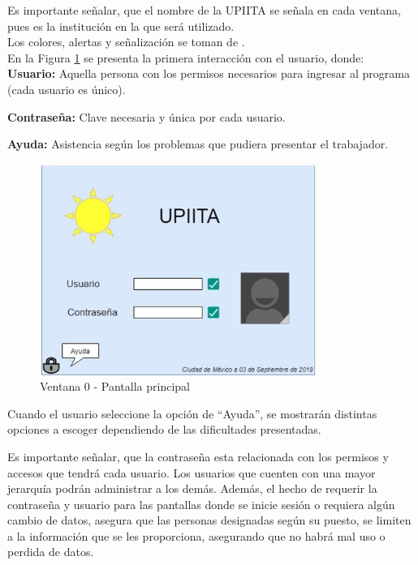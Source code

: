 Es importante señalar, que el nombre de la UPIITA se señala en cada ventana, pues es la institución en la que será utilizado.\\
Los colores, alertas y señalización se toman de \cite{DC5}.\\

En la Figura \ref{fig:v0} se presenta la primera interacción con el usuario, donde:\\

\textbf{Usuario:} Aquella persona con los permisos necesarios para ingresar al programa (cada usuario es único).

\textbf{Contraseña:} Clave necesaria y única por cada usuario.

\textbf{Ayuda:} Asistencia según los problemas que pudiera presentar el trabajador.

\begin{figure}[H]
	\centering
	\includegraphics[width=9cm]{imagenes/v0}
	\caption{Ventana 0 - Pantalla principal}
	\label{fig:v0}
\end{figure}

Cuando el usuario seleccione la opción de ``Ayuda'', se mostrarán distintas opciones a escoger dependiendo de las dificultades presentadas.

Es importante señalar, que la contraseña esta relacionada con los permisos y accesos que tendrá cada usuario. Los usuarios que cuenten con una mayor jerarquía podrán administrar a los demás. Además, el hecho de requerir la contraseña y usuario para las pantallas donde se inicie sesión o requiera algún cambio de datos, asegura que las personas designadas según su puesto, se limiten a la información que se les proporciona, asegurando que no habrá mal uso o perdida de datos. 

